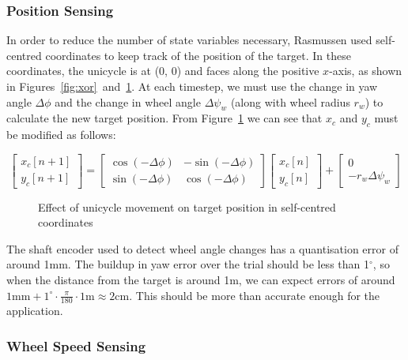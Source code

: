 \documentclass{IIBproject}
\begin{document}
\subsubsection{Position Sensing}
\label{sec:position_sensing}

In order to reduce the number of state variables necessary, Rasmussen used
self-centred coordinates to keep track of the position of the target. In these
coordinates, the unicycle is at (0, 0) and faces along the positive $x$-axis,
as shown in Figures~\ref{fig:xor}~and~\ref{fig:scc}. At each timestep, we must
use the change in yaw angle $\Delta\phi$ and the change in wheel angle
$\Delta\psi_w$ (along with wheel radius $r_w$) to calculate the new target
position. From Figure~\ref{fig:scc} we can see that $x_c$ and $y_c$ must be
modified as follows:

\[
\begin{bmatrix}
  x_c[n+1] \\
  y_c[n+1]
\end{bmatrix} =
\begin{bmatrix}
  \cos(-\Delta\phi) & -\sin(-\Delta\phi) \\
  \sin(-\Delta\phi) & \cos(-\Delta\phi)
\end{bmatrix}
\begin{bmatrix}
  x_c[n] \\
  y_c[n]
\end{bmatrix} +
\begin{bmatrix}
  0 \\ -r_w\Delta \psi_w
\end{bmatrix}
\]

\begin{figure}[htpb]
  \begin{center}
    \def\svgwidth{15cm}
    
    \end{center}
    \caption{Effect of unicycle movement on target position in self-centred
    coordinates}
    \label{fig:scc}
    \end{figure}

The shaft encoder used to detect wheel angle changes has a quantisation error
of around 1mm. The buildup in yaw error over the trial should be less than
1$^\circ$, so when the distance from the target is around 1m, we can expect
errors of around $1\textrm{mm} + 1^\circ \cdot \frac{\pi}{180} \cdot
1\textrm{m} \approx 2$cm.  This should be more than accurate enough for the
application.

\subsubsection{Wheel Speed Sensing}
\end{document}

